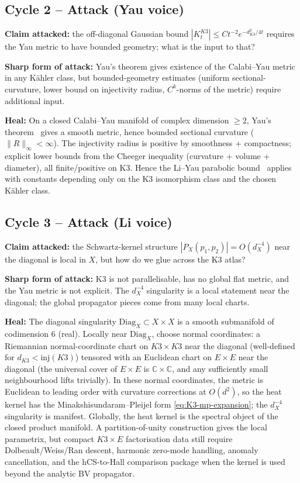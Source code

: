 \documentclass[11pt]{amsart}
\providecommand{\C}{\mathbb{C}}
\providecommand{\Diag}{\mathrm{Diag}}
\theoremstyle{definition}
\theoremstyle{remark}
\begin{document}
\subsection*{Cycle 2 -- Attack (Yau voice)}

\textbf{Claim attacked:} the off-diagonal Gaussian bound
$|K_t^{K3}| \leq C t^{-2} e^{-d_{K3}^2/4t}$ requires the Yau
metric to have bounded geometry; what is the input to that?

\textbf{Sharp form of attack:} Yau's theorem gives existence of
the Calabi--Yau metric in any K\"ahler class, but bounded-geometry
estimates (uniform sectional-curvature, lower bound on
injectivity radius, $C^k$-norms of the metric) require additional
input.

\textbf{Heal:} On a closed Calabi--Yau manifold of complex dimension
$\geq 2$, Yau's theorem~\cite{Yau1978} gives a smooth metric,
hence bounded sectional curvature ($\|R\|_\infty < \infty$). The
injectivity radius is positive by smoothness + compactness; explicit
lower bounds from the Cheeger inequality (curvature + volume +
diameter), all finite/positive on K3. Hence the Li--Yau parabolic
bound~\cite{LiYau1986} applies with constants depending only on
the K3 isomorphism class and the chosen K\"ahler class.

\subsection*{Cycle 3 -- Attack (Li voice)}

\textbf{Claim attacked:} the Schwartz-kernel structure
$|P_X(p_1,p_2)| = O(d_X^{-4})$ near the diagonal is local in $X$,
but how do we glue across the K3 atlas?

\textbf{Sharp form of attack:} K3 is not parallelisable, has no
global flat metric, and the Yau metric is not explicit. The
$d_X^{-4}$ singularity is a local statement near the diagonal;
the global propagator pieces come from many local charts.

\textbf{Heal:} The diagonal singularity $\Diag_X \subset X \times X$
is a smooth submanifold of codimension $6$ (real). Locally near
$\Diag_X$, choose normal coordinates: a Riemannian normal-coordinate
chart on $K3 \times K3$ near the diagonal (well-defined for
$d_{K3} < \mathrm{inj}(K3)$) tensored with an Euclidean chart on
$E \times E$ near the diagonal (the universal cover of $E \times E$
is $\C \times \C$, and any sufficiently small neighbourhood lifts
trivially). In these normal coordinates, the metric is Euclidean
to leading order with curvature corrections at $O(d^2)$, so the
heat kernel has the Minakshisundaram--Pleijel form
\eqref{eq:K3-mp-expansion}; the $d_X^{-4}$ singularity is
manifest. Globally, the heat kernel is the spectral object of the
closed product manifold. A partition-of-unity construction gives the
local parametrix, but compact $K3\times E$ factorisation data still
require Dolbeault/Weiss/Ran descent, harmonic zero-mode handling,
anomaly cancellation, and the hCS-to-Hall comparison package when the
kernel is used beyond the analytic BV propagator.
\end{document}
